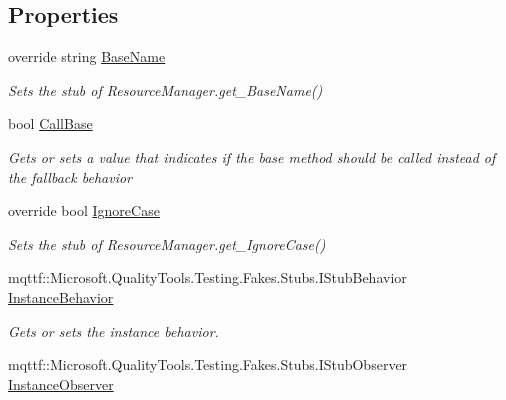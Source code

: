 \subsection*{Properties}
\begin{DoxyCompactItemize}
\item 
override string \hyperlink{class_system_1_1_component_model_1_1_fakes_1_1_stub_component_resource_manager_added07d6f0ee8844f6455286de79dde2}{Base\-Name}
\begin{DoxyCompactList}\small\item\em Sets the stub of Resource\-Manager.\-get\-\_\-\-Base\-Name()\end{DoxyCompactList}\item 
bool \hyperlink{class_system_1_1_component_model_1_1_fakes_1_1_stub_component_resource_manager_a0ecdd9fbbef58b4133c92ef46ca318d2}{Call\-Base}
\begin{DoxyCompactList}\small\item\em Gets or sets a value that indicates if the base method should be called instead of the fallback behavior\end{DoxyCompactList}\item 
override bool \hyperlink{class_system_1_1_component_model_1_1_fakes_1_1_stub_component_resource_manager_a4b4b458e89601aa9b1676c787fd83d49}{Ignore\-Case}
\begin{DoxyCompactList}\small\item\em Sets the stub of Resource\-Manager.\-get\-\_\-\-Ignore\-Case()\end{DoxyCompactList}\item 
mqttf\-::\-Microsoft.\-Quality\-Tools.\-Testing.\-Fakes.\-Stubs.\-I\-Stub\-Behavior \hyperlink{class_system_1_1_component_model_1_1_fakes_1_1_stub_component_resource_manager_a35dc2d371881913c2205c18b68c858e7}{Instance\-Behavior}
\begin{DoxyCompactList}\small\item\em Gets or sets the instance behavior.\end{DoxyCompactList}\item 
mqttf\-::\-Microsoft.\-Quality\-Tools.\-Testing.\-Fakes.\-Stubs.\-I\-Stub\-Observer \hyperlink{class_system_1_1_component_model_1_1_fakes_1_1_stub_component_resource_manager_a448bed32f4d945a969f355dc75546ea6}{Instance\-Observer}

\end{DoxyCompactItemize}
